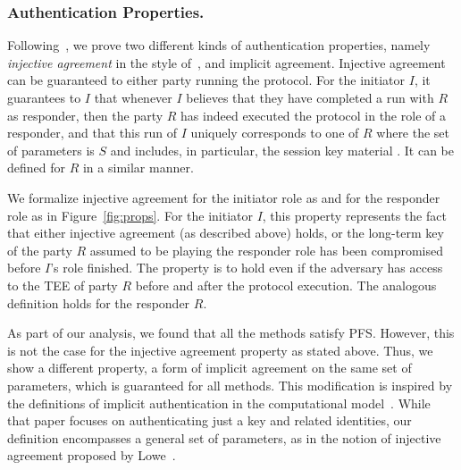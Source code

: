 \subsubsection{Authentication Properties.}
\label{sec:authenticationDef}
Following~\cite{Norr21}, we prove two different kinds of authentication
properties, namely \emph{injective agreement} in the style
of~\cite{DBLP:conf/csfw/Lowe97a}, and implicit agreement.
%
Injective agreement can be guaranteed to either party running the protocol.
%
For the initiator $I$, it guarantees to $I$ that whenever $I$ believes that
they have completed a run with $R$ as responder, then the party $R$ has 
indeed
executed the protocol in the role of a responder, and that this run of $I$
uniquely corresponds to one of $R$ where the set of parameters is $S$ and
includes, in particular, the session key material \mSessKey{}.
%
It can be defined for $R$ in a similar manner.

%
We formalize injective agreement for the initiator role as \mPredInjI{} and
for the responder role as \mPredInjR{} in Figure~\ref{fig:props}.
%
For the initiator $I$, this property represents the fact that either
injective agreement (as described above) holds, or the long-term key of
the party $R$ assumed to be playing the responder role has been
compromised before $I$'s role finished.
%
The property is to hold even if the adversary has access to the TEE of party $R$
before and after the protocol execution.
%
The analogous definition holds for the responder $R$.
%

As part of our analysis, we found that all the \mEdhoc{} methods satisfy PFS.
%
However, this is not the case for the injective agreement property as stated 
above.
%
Thus, we show a different property, a form of implicit agreement on the same
set of parameters, which is guaranteed for all methods.
%
This modification is inspired by the definitions of implicit authentication in
the computational model~\cite{DBLP:conf/csfw/GuilhemFW20}.
%
While that paper focuses on authenticating just a key and related identities,
our definition encompasses a general set of parameters, as in the notion of
injective agreement proposed by Lowe~\cite{DBLP:conf/csfw/Lowe97a}.

